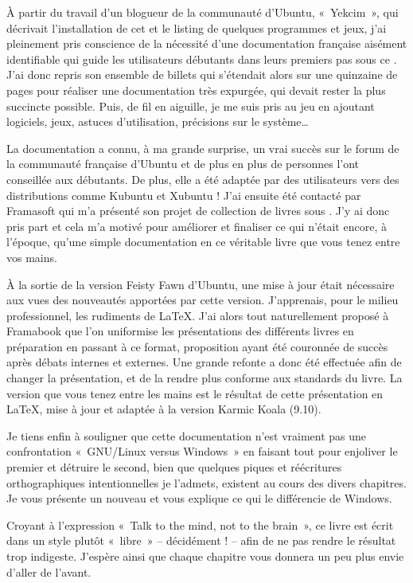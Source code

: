 À partir du travail d'un blogueur de la communauté d'Ubuntu, «~Yekcim~», qui décrivait l'installation de cet  et le listing de quelques programmes et jeux, j'ai pleinement pris conscience de la nécessité d'une documentation française aisément identifiable qui guide les utilisateurs débutants dans leurs premiers pas sous ce . J'ai donc repris son ensemble de billets qui s'étendait alors sur une quinzaine de pages pour réaliser une documentation très expurgée, qui devait rester la plus succincte possible. Puis, de fil en aiguille, je me suis pris au jeu en ajoutant logiciels, jeux, astuces d'utilisation, précisions sur le système\ldots{}\par
La documentation a connu, à ma grande surprise, un vrai succès sur le forum de la communauté française d'Ubuntu et de plus en plus de personnes l'ont conseillée aux débutants. De plus, elle a été adaptée par des utilisateurs vers des distributions comme Kubuntu et Xubuntu ! J'ai ensuite été contacté par Framasoft qui m'a présenté son projet de collection de livres sous . J'y ai donc pris part et cela m'a motivé pour améliorer et finaliser ce qui n'était encore, à l'époque, qu'une simple documentation en ce véritable livre que vous tenez entre vos mains.\par
À la sortie de la version Feisty Fawn d'Ubuntu, une mise à jour était nécessaire aux vues des nouveautés apportées par cette version. J'apprenais, pour le milieu professionnel, les rudiments de \LaTeX{}. J'ai alors tout naturellement proposé à Framabook que l'on uniformise les présentations des différents livres en préparation en passant à ce format, proposition ayant été couronnée de succès après débats internes et externes. Une grande refonte a donc été effectuée afin de changer la présentation, et de la rendre plus conforme aux standards du livre. La version que vous tenez entre les mains est le résultat de cette présentation en \LaTeX{}, mise à jour et adaptée à la version Karmic Koala (9.10).\par
Je tiens enfin à souligner que cette documentation n'est vraiment pas une confrontation «~GNU/Linux versus Windows~» en faisant tout pour enjoliver le premier et détruire le second, bien que quelques piques et réécritures orthographiques intentionnelles je l'admets, existent au cours des divers chapitres. Je vous présente un nouveau  et vous explique ce qui le différencie de Windows.\par
Croyant à l'expression «~Talk to the mind, not to the brain~», ce livre est écrit dans un style plutôt «~libre~» -- décidément ! -- afin de ne pas rendre le résultat trop indigeste. J'espère ainsi que chaque chapitre vous donnera un peu plus envie d'aller de l'avant.\par
